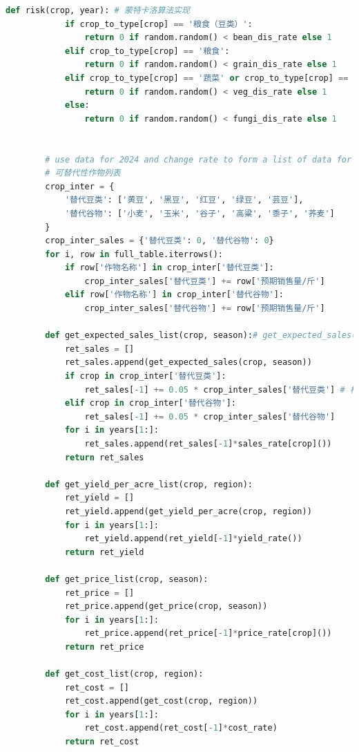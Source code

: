 \documentclass{cumcmthesis}
\begin{document}
\begin{appendices}
\begin{lstlisting}[language=python]
        def risk(crop, year): # 蒙特卡洛算法实现
            if crop_to_type[crop] == '粮食（豆类）':
                return 0 if random.random() < bean_dis_rate else 1
            elif crop_to_type[crop] == '粮食':
                return 0 if random.random() < grain_dis_rate else 1
            elif crop_to_type[crop] == '蔬菜' or crop_to_type[crop] == '蔬菜（豆类）':
                return 0 if random.random() < veg_dis_rate else 1
            else:
                return 0 if random.random() < fungi_dis_rate else 1
    
    
        # use data for 2024 and change rate to form a list of data for 2024-2030
        # 可替代性作物列表
        crop_inter = {
            '替代豆类': ['黄豆', '黑豆', '红豆', '绿豆', '芸豆'],
            '替代谷物': ['小麦', '玉米', '谷子', '高粱', '黍子', '荞麦']
        }
        crop_inter_sales = {'替代豆类': 0, '替代谷物': 0}
        for i, row in full_table.iterrows():
            if row['作物名称'] in crop_inter['替代豆类']:
                crop_inter_sales['替代豆类'] += row['预期销售量/斤']
            elif row['作物名称'] in crop_inter['替代谷物']:
                crop_inter_sales['替代谷物'] += row['预期销售量/斤']
        
        def get_expected_sales_list(crop, season):# get_expected_sales(crop, season)[year-2024]
            ret_sales = []
            ret_sales.append(get_expected_sales(crop, season))
            if crop in crop_inter['替代豆类']:
                ret_sales[-1] += 0.05 * crop_inter_sales['替代豆类'] # 相互可替代的作物拥有一部分可公用预期销售量
            elif crop in crop_inter['替代谷物']:
                ret_sales[-1] += 0.05 * crop_inter_sales['替代谷物']
            for i in years[1:]:
                ret_sales.append(ret_sales[-1]*sales_rate[crop]())
            return ret_sales
        
        def get_yield_per_acre_list(crop, region):
            ret_yield = []
            ret_yield.append(get_yield_per_acre(crop, region))
            for i in years[1:]:
                ret_yield.append(ret_yield[-1]*yield_rate())
            return ret_yield
        
        def get_price_list(crop, season):
            ret_price = []
            ret_price.append(get_price(crop, season))
            for i in years[1:]:
                ret_price.append(ret_price[-1]*price_rate[crop]())
            return ret_price
        
        def get_cost_list(crop, region):
            ret_cost = []
            ret_cost.append(get_cost(crop, region))
            for i in years[1:]:
                ret_cost.append(ret_cost[-1]*cost_rate)
            return ret_cost
        

\end{lstlisting}
\end{appendices}
\end{document}
